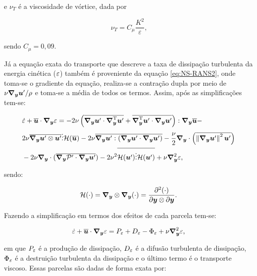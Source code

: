 \noindent e $\nu_T$ é a viscosidade de vórtice, dada por

\begin{equation}
    \nu_T=C_\mu\frac{K^2}{\varepsilon}\text{,}
\end{equation}

\noindent sendo $C_\mu=0,09$.

Já a equação exata do transporte que descreve a taxa de dissipação turbulenta da energia cinética ($\ep$) também é proveniente da equação \eqref{eq:NS-RANS2}, onde toma-se o gradiente da equação, realiza-se a contração dupla por meio de $\nu\Ny\BB{u}'/\rho$ e toma-se a média de todos os termos. Assim, após as simplificações tem-se:

\begin{equation}
    \begin{split}
        &\dot{\ep}+\BBB{u}\cdot\Ny\ep=-2\nu\bigpar{\bar{\Ny\BB{u}'\cdot\NyT\BB{u}'}+\bar{\NyT\BB{u}'\cdot\Ny\BB{u}'}}:\Ny\BBB{u}-\\
        &2\nu\bar{\Ny\BB{u}'\otimes\BB{u}'}\vdots\script{H}{(\BBB{u})}-2\nu\bar{\Ny\BB{u}':(\Ny\BB{u}'\cdot\Ny\BB{u}')}-\frac{\nu}{2}\Ny\cdot\bigpar{\bar{\norm{\Ny\BB{u}'}^2\BB{u}'}}\\
        &-2\nu\Ny\cdot(\bar{\Ny\pr'\cdot\Ny\BB{u}'})-2\nu^2\bar{\script{H}(\BB{u}')\vdots\script{H}(\BB{u}')}+\nu\Lapl\varepsilon\text{,}
    \end{split}
\end{equation}

\noindent sendo:

\begin{equation}
    \script{H}(\cdot)=\Ny\otimes\Ny(\cdot)=\frac{\partial^2(\cdot)}{\partial\BB{y}\otimes\partial\BB{y}}\text{.}
\end{equation}

Fazendo a simplificação em termos dos efeitos de cada parcela tem-se:

\begin{equation}
    \dot{\ep}+\BBB{u}\cdot\Ny\ep=P_\ep+D_\ep-\Phi_\ep+\nu\Lapl\ep\text{,}
\end{equation}

\noindent em que $P_\ep$ é a produção de dissipação, $D_\ep$ é a difusão turbulenta de dissipação, $\Phi_\ep$ é a destruição turbulenta da dissipação e o último termo é o transporte viscoso. Essas parcelas são dadas de forma exata por:

